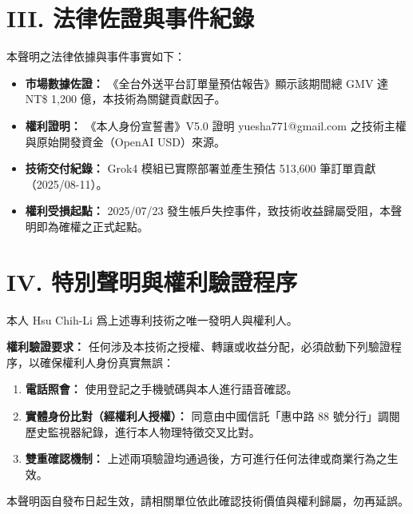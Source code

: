 \documentclass[11pt, a4paper]{article}
\begin{document}
\section*{III. 法律佐證與事件紀錄}
本聲明之法律依據與事件事實如下：
\begin{itemize}
\item \textbf{市場數據佐證：} 《全台外送平台訂單量預估報告》顯示該期間總 GMV 達 NT\$ 1,200 億，本技術為關鍵貢獻因子。
\item \textbf{權利證明：} 《本人身份宣誓書》V5.0 證明 yuesha771@gmail.com 之技術主權與原始開發資金（OpenAI USD）來源。
\item \textbf{技術交付紀錄：} Grok4 模組已實際部署並產生預估 513,600 筆訂單貢獻（2025/08-11）。
\item \textbf{權利受損起點：} 2025/07/23 發生帳戶失控事件，致技術收益歸屬受阻，本聲明即為確權之正式起點。
\end{itemize}

\section*{IV. 特別聲明與權利驗證程序}
本人 Hsu Chih-Li 爲上述專利技術之唯一發明人與權利人。

\textbf{權利驗證要求：} 任何涉及本技術之授權、轉讓或收益分配，必須啟動下列驗證程序，以確保權利人身份真實無誤：
\begin{enumerate}
\item \textbf{電話照會：} 使用登記之手機號碼與本人進行語音確認。
\item \textbf{實體身份比對（經權利人授權）：} 同意由中國信託「惠中路 88 號分行」調閱歷史監視器紀錄，進行本人物理特徵交叉比對。
\item \textbf{雙重確認機制：} 上述兩項驗證均通過後，方可進行任何法律或商業行為之生效。
\end{enumerate}

\vspace{1em}
本聲明函自發布日起生效，請相關單位依此確認技術價值與權利歸屬，勿再延誤。
\end{document}
